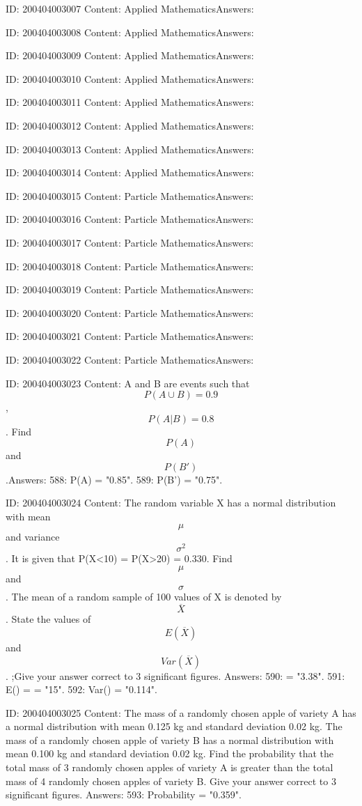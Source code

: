 \documentclass{article}
\begin{document}
ID: 200404003007
Content:
Applied MathematicsAnswers:

ID: 200404003008
Content:
Applied MathematicsAnswers:

ID: 200404003009
Content:
Applied MathematicsAnswers:

ID: 200404003010
Content:
Applied MathematicsAnswers:

ID: 200404003011
Content:
Applied MathematicsAnswers:

ID: 200404003012
Content:
Applied MathematicsAnswers:

ID: 200404003013
Content:
Applied MathematicsAnswers:

ID: 200404003014
Content:
Applied MathematicsAnswers:

ID: 200404003015
Content:
Particle MathematicsAnswers:

ID: 200404003016
Content:
Particle MathematicsAnswers:

ID: 200404003017
Content:
Particle MathematicsAnswers:

ID: 200404003018
Content:
Particle MathematicsAnswers:

ID: 200404003019
Content:
Particle MathematicsAnswers:

ID: 200404003020
Content:
Particle MathematicsAnswers:

ID: 200404003021
Content:
Particle MathematicsAnswers:

ID: 200404003022
Content:
Particle MathematicsAnswers:

ID: 200404003023
Content:
A and B are events such that $$P(A \cup B) = 0.9$$, $$P (A|B)=0.8$$. Find $$P(A)$$ and $$P(B')$$.Answers:
588: P(A) = "0.85".
589: P(B') = "0.75".

ID: 200404003024
Content:
The random variable X has a normal distribution with mean $$\mu$$  and variance $$\sigma^2$$. It is given that P(X<10) = P(X>20) = 0.330. Find $$\mu$$ and $$\sigma$$.  The mean of a random sample of 100 values of X is denoted by $$\overline{X}$$ . State the values of $$E(\overline{X})$$ and $$Var(\overline{X})$$. ;Give your answer correct to 3 significant figures. Answers:
590: \sigma = "3.38".
591: E() = \mu = "15".
592: Var() = "0.114".

ID: 200404003025
Content:
The mass of a randomly chosen apple of variety A has a normal distribution with mean 0.125 kg and standard deviation 0.02 kg. The mass of a randomly chosen apple of variety B has a normal distribution with mean 0.100 kg and standard deviation 0.02 kg. Find the probability that the total mass of 3 randomly chosen apples of variety A is greater than the total mass of 4 randomly chosen apples of variety B.  Give your answer correct to 3 significant figures. Answers:
593: Probability = "0.359".
\end{document}
